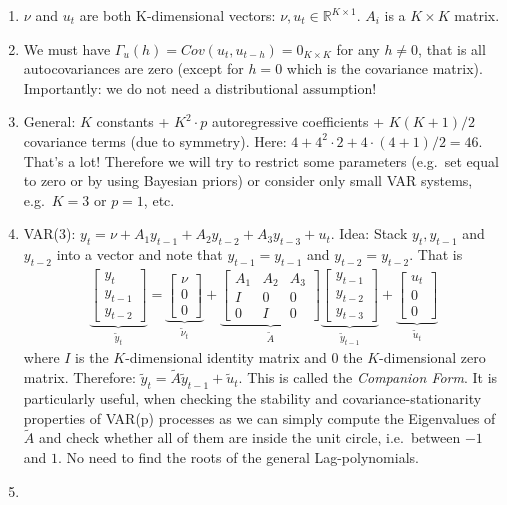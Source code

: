 \begin{enumerate}
\item \(\nu \) and \(u_t\) are both K-dimensional vectors: \(\nu,u_t \in \mathbb{R}^{K \times 1}\).
\(A_i\) is a \(K \times K\) matrix.

\item We must have \({\Gamma_u(h)} = Cov(u_t, u_{t-h}) = 0_{K\times K}\) for any \(h\neq0\),
  that is all autocovariances are zero
  (except for \(h=0\) which is the covariance matrix).
Importantly: we do not need a distributional assumption!

\item General: \(K\) constants + \(K^2\cdot p\) autoregressive coefficients + \(K(K+1)/2\) covariance terms (due to symmetry).
Here: \(4 + 4^2 \cdot 2 + 4 \cdot (4+1)/2 = 46\).
That's a lot!
Therefore we will try to restrict some parameters (e.g.\ set equal to zero or by using Bayesian priors)
  or consider only small VAR systems, e.g.\
  \(K=3\) or \(p=1\), etc.

\item VAR{(3)}: \(y_t = \nu + A_1 y_{t-1} + A_2 y_{t-2} + A_3 y_{t-3} + u_t\).
Idea: Stack \(y_t, y_{t-1}\) and \(y_{t-2}\) into a vector and note that \(y_{t-1}=y_{t-1}\) and \(y_{t-2}=y_{t-2}\).
That is
\begin{align*}
\underbrace{\begin{bmatrix} y_t \\ y_{t-1} \\ y_{t-2} \end{bmatrix}}_{\widetilde{y}_t}
= \underbrace{\begin{bmatrix} \nu \\ 0 \\ 0 \end{bmatrix}}_{\widetilde{\nu}_t}
+ \underbrace{\begin{bmatrix} A_1 & A_2 & A_3 \\ I & 0 & 0 \\ 0 & I & 0 \end{bmatrix}}_{\widetilde{A}}
  \underbrace{\begin{bmatrix} y_{t-1} \\ y_{t-2} \\ y_{t-3} \end{bmatrix}}_{\widetilde{y}_{t-1}}
+ \underbrace{\begin{bmatrix} u_t \\ 0 \\ 0 \end{bmatrix}}_{\widetilde{u}_t}
\end{align*}
where \(I\) is the \(K\)-dimensional identity matrix and \(0\) the \(K\)-dimensional zero matrix.
Therefore: \(\widetilde{y}_t = \widetilde{A} \widetilde{y}_{t-1} + \widetilde{u}_t\).
This is called the \emph{Companion Form}.
It is particularly useful, when checking the stability and covariance-stationarity properties of VAR{(p)} processes 
  as we can simply compute the Eigenvalues of \(\widetilde{A}\)
  and check whether all of them are inside the unit circle, i.e.\ between \(-1\) and \(1\).
No need to find the roots of the general Lag-polynomials.

\item 
\end{enumerate}